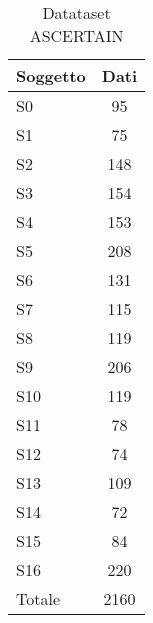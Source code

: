 \begin{table}[h]
	\begin{center}
		\begin{tabular}{l|c}
		     \textbf{Soggetto} & \textbf{Dati}\\
		     \hline
		     S0 & 95 \\
		     S1 & 75 \\
		     S2 & 148 \\
		     S3 & 154 \\
		     S4 & 153 \\
		     S5 & 208 \\
		     S6 & 131 \\
		     S7 & 115 \\
		     S8 & 119 \\
		     S9 & 206 \\
		     S10 & 119 \\
		     S11 & 78 \\
		     S12 & 74 \\
		     S13 & 109 \\
		     S14 & 72 \\
		     S15 & 84 \\
		     S16 & 220 \\
		     \hline
		     Totale & 2160
		\end{tabular}
		\caption{Datataset ASCERTAIN}
		\label{tab:splittedascertain}
	\end{center}
\end{table}

